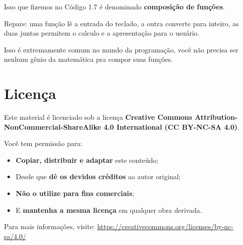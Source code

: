 \documentclass[12pt]{book}
\begin{document}
	\begin{tcolorbox}[colback=gray!10, colframe=black, title={\large\bfseries Observação}]
		Isso que fizemos no Código 1.7 é denominado \textbf{composição de funções}.
		
		Repare: uma função lê a entrada do teclado, a outra converte para inteiro, as duas juntas permitem o calculo e a apresentação para o usuário. \newline
		
		Isso é extremamente comum no mundo da programação, você não precisa ser nenhum gênio da matemática pra compor suas funções.
	\end{tcolorbox}
	
	\newpage
	\section*{Licença \faCreativeCommons}
	
	Este material é licenciado sob a licença \textbf{Creative Commons Attribution-NonCommercial-ShareAlike 4.0 International (CC BY-NC-SA 4.0)}.
	
	\vspace{1em}
	
	Você tem permissão para:
	
	\begin{itemize}
		\item \textbf{Copiar, distribuir e adaptar} este conteúdo;
		\item Desde que \textbf{dê os devidos créditos} ao autor original;
		\item \textbf{Não o utilize para fins comerciais};
		\item E \textbf{mantenha a mesma licença} em qualquer obra derivada.
	\end{itemize}
	
	\vspace{1em}
	
	Para mais informações, visite:  
	\href{https://creativecommons.org/licenses/by-nc-sa/4.0/}{https://creativecommons.org/licenses/by-nc-sa/4.0/}
	
	\vfill
	
	\begin{center}
		\faCreativeCommons\quad
		\faCreativeCommonsBy\quad
		\faCreativeCommonsNc\quad
		\faCreativeCommonsSa
	\end{center}
	
\end{document}
